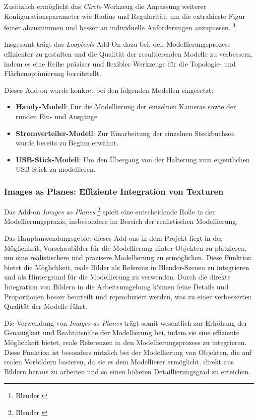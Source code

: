 Zusätzlich ermöglicht das \textit{Circle}-Werkzeug die Anpassung weiterer Konfigurationsparameter wie Radius und Regularität, um die extrahierte Figur feiner abzustimmen und besser an individuelle Anforderungen anzupassen. \footnote{Blender \cite{Circle-Werkzeug}}

Insgesamt trägt das \textit{Looptools} Add-On dazu bei, den Modellierungsprozess effizienter zu gestalten und die Qualität der resultierenden Modelle zu verbessern, indem es eine Reihe präziser und flexibler Werkzeuge für die Topologie- und Flächenoptimierung bereitstellt.

Dieses Add-on wurde konkret bei den folgenden Modellen eingesetzt:
\begin{itemize}
    \item \textbf{Handy-Modell}: Für die Modellierung der einzelnen Kameras sowie der runden Ein- und Ausgänge
    \item \textbf{Stromverteiler-Modell}: Zur Einarbeitung der einzelnen Steckbuchsen wurde bereits zu Beginn erwähnt.
    \item \textbf{USB-Stick-Modell}: Um den Übergang von der Halterung zum eigentlichen USB-Stick zu modellieren.
\end{itemize}

\subsubsection{Images as Planes: Effiziente Integration von Texturen}
Das Add-on \textit{Images as Planes} \footnote{Blender \cite{Images as Planes}} spielt eine entscheidende Rolle in der Modellierungspraxis, insbesondere im Bereich der realistischen Modellierung.

Das Hauptanwendungsgebiet dieses Add-ons in dem Projekt liegt in der Möglichkeit, Vorschaubilder für die Modellierung hinter Objekten zu platzieren, um eine realistischere und präzisere Modellierung zu ermöglichen. Diese Funktion bietet die Möglichkeit, reale Bilder als Referenz in Blender-Szenen zu integrieren und als Hintergrund für die Modellierung zu verwenden. Durch die direkte Integration von Bildern in die Arbeitsumgebung können feine Details und Proportionen besser beurteilt und reproduziert werden, was zu einer verbesserten Qualität der Modelle führt.

Die Verwendung von \textit{Images as Planes} trägt somit wesentlich zur Erhöhung der Genauigkeit und Realitätsnähe der Modellierung bei, indem sie eine effiziente Möglichkeit bietet, reale Referenzen in den Modellierungsprozess zu integrieren. Diese Funktion ist besonders nützlich bei der Modellierung von Objekten, die auf realen Vorbildern basieren, da sie es dem Modellierer ermöglicht, direkt aus Bildern heraus zu arbeiten und so einen höheren Detaillierungsgrad zu erreichen.

